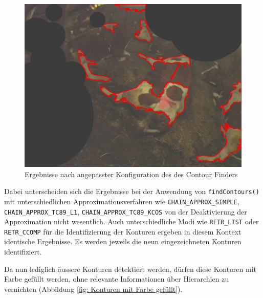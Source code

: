 \begin{figure}[H]
	\center
	\includegraphics[scale=0.43]{Grafiken/entwicklung/13SimpleThresholdingConoturOutlineLIST.jpg}
	\caption{Ergebnisse nach angepasster Konfiguration des des Contour Finders} 
	\label{fig: Ergebnisse nach angepasster Konfiguration des des Contour Finders} 
\end{figure}

Dabei unterscheiden sich die Ergebnisse bei der Anwendung von \texttt{findContours()} mit unterschiedlichen Approximationsverfahren wie \texttt{CHAIN_APPROX_SIMPLE}, \texttt{CHAIN_APPROX_TC89_L1}, \texttt{CHAIN_APPROX_TC89_KCOS} von der Deaktivierung der Approximation  nicht wesentlich. Auch unterschiedliche Modi wie \texttt{RETR_LIST} oder \texttt{RETR_CCOMP} für die Identifizierung der Konturen ergeben in diesem Kontext identische Ergebnisse. Es werden jeweils die neun eingezeichneten Konturen identifiziert.

Da nun lediglich äussere Konturen detektiert werden, dürfen diese Konturen mit Farbe gefüllt werden, ohne relevante Informationen über Hierarchien zu vernichten (Abbildung \ref{fig: Konturen mit Farbe gefüllt}). 

